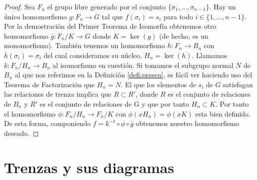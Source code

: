 \documentclass[12pt]{book}
\theoremstyle{definition}
\begin{document}
\begin{proof} Sea $F_n$ el grupo libre generado por el conjunto $\{\sigma_1,...,\sigma_{n-1}\}$. Hay un único homomorfismo $g:F_n\rightarrow G$ tal que $f(\sigma_i)= s_i$ para todo $i\in\{1,...,n-1\}$. Por la demostración del Primer Teorema de Isomorfía obtenemos otro homomorfismo $\bar{g}:F_n/K\rightarrow G$ donde $K=\ker(g)$ (de hecho, es un monomorfismo). También tenemos un homomorfismo $h:F_n\rightarrow B_n$ con $h(\sigma_i)=\sigma_i$ del cual consideramos su núcleo, $H_n=\ker(h)$. Llamamos $k:F_n/H_n\rightarrow B_n$ al isomorfismo en cuestión. Si tomamos el subgrupo normal $N$ de $B_n$ al que nos referimos en la Definición \ref{defi:presen}, es fácil ver haciendo uso del Teorema de Factorización que $H_n = N$. El que los elementos de $s_i$ de $G$ satisfagan las relaciones de trenza implica que $R\subset R'$, donde $R$ es el conjunto de relaciones de $B_n$ y $R'$ es el conjunto de relaciones de G y que por tanto $H_n\subset K$. Por tanto el homomorfismo $\phi:F_n/H_n\rightarrow F_n/K$ con $\phi(xH_n)=\phi(xK)$ esta bien definido. De esta forma, componiendo $f=k^{-1}\circ \phi \circ \bar{g}$ obtenemos nuestro homomorfismo deseado.
\end{proof}



\section{Trenzas y sus diagramas}
\end{document}

